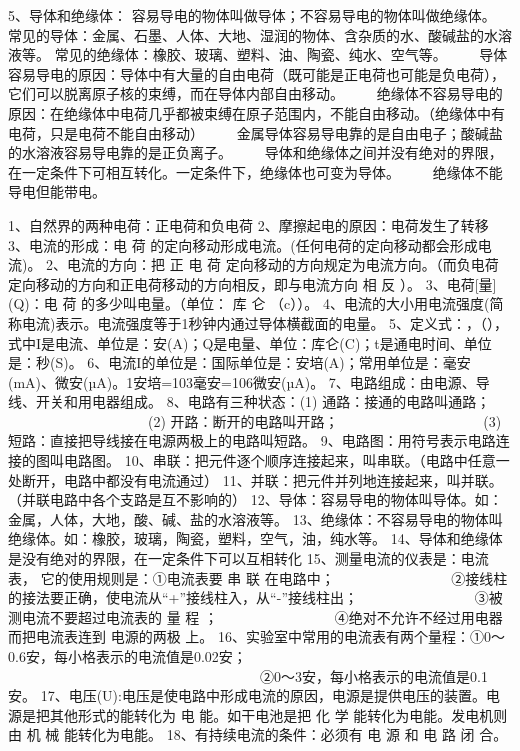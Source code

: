 \documentclass[12pt]{exam}
\begin{document}
5、导体和绝缘体：
容易导电的物体叫做导体；不容易导电的物体叫做绝缘体。
常见的导体：金属、石墨、人体、大地、湿润的物体、含杂质的水、酸碱盐的水溶液等。
常见的绝缘体：橡胶、玻璃、塑料、油、陶瓷、纯水、空气等。
　　导体容易导电的原因：导体中有大量的自由电荷（既可能是正电荷也可能是负电荷），它们可以脱离原子核的束缚，而在导体内部自由移动。
　　绝缘体不容易导电的原因：在绝缘体中电荷几乎都被束缚在原子范围内，不能自由移动。（绝缘体中有电荷，只是电荷不能自由移动）
　　金属导体容易导电靠的是自由电子；酸碱盐的水溶液容易导电靠的是正负离子。
　　导体和绝缘体之间并没有绝对的界限，在一定条件下可相互转化。一定条件下，绝缘体也可变为导体。
　　绝缘体不能导电但能带电。



1、自然界的两种电荷：正电荷和负电荷
2、摩擦起电的原因：电荷发生了转移
3、电流的形成：电  荷  的定向移动形成电流。(任何电荷的定向移动都会形成电流)。
2、电流的方向：把 正 电 荷 定向移动的方向规定为电流方向。（而负电荷定向移动的方向和正电荷移动的方向相反，即与电流方向 相 反 ）。
3、电荷[量](Q)：电 荷 的多少叫电量。（单位： 库 仑 （c））。
4、电流的大小用电流强度(简称电流)表示。电流强度等于1秒钟内通过导体横截面的电量。
5、定义式：，（），式中I是电流、单位是：安(A)；Q是电量、单位：库仑(C)；t是通电时间、单位是：秒(S)。
6、电流I的单位是：国际单位是：安培(A)；常用单位是：毫安(mA)、微安(µA)。1安培=103毫安=106微安(µA)。
7、电路组成：由电源、导线、开关和用电器组成。
8、电路有三种状态：(1) 通路：接通的电路叫通路；
　　　　　　　　　　(2) 开路：断开的电路叫开路；
　　　　　　　　　　(3) 短路：直接把导线接在电源两极上的电路叫短路。
9、电路图：用符号表示电路连接的图叫电路图。
10、串联：把元件逐个顺序连接起来，叫串联。（电路中任意一处断开，电路中都没有电流通过）
11、并联：把元件并列地连接起来，叫并联。（并联电路中各个支路是互不影响的）
12、导体：容易导电的物体叫导体。如：金属，人体，大地，酸、碱、盐的水溶液等。
13、绝缘体：不容易导电的物体叫绝缘体。如：橡胶，玻璃，陶瓷，塑料，空气，油，纯水等。
14、导体和绝缘体是没有绝对的界限，在一定条件下可以互相转化
15、测量电流的仪表是：电流表，
它的使用规则是：①电流表要  串 联  在电路中；
　　　　　　　　②接线柱的接法要正确，使电流从“+”接线柱入，从“-”接线柱出；
　　　　　　　　③被测电流不要超过电流表的 量 程 ；
　　　　　　　　④绝对不允许不经过用电器而把电流表连到 电源的两极 上。
16、实验室中常用的电流表有两个量程：①0～0.6安，每小格表示的电流值是0.02安；
　　　　　　　　　　　　　　　　　　②0～3安，每小格表示的电流值是0.1安。
17、电压(U):电压是使电路中形成电流的原因，电源是提供电压的装置。电源是把其他形式的能转化为 电 能。如干电池是把 化 学 能转化为电能。发电机则由 机 械 能转化为电能。
18、有持续电流的条件：必须有 电 源 和 电 路 闭 合。
\end{document}
